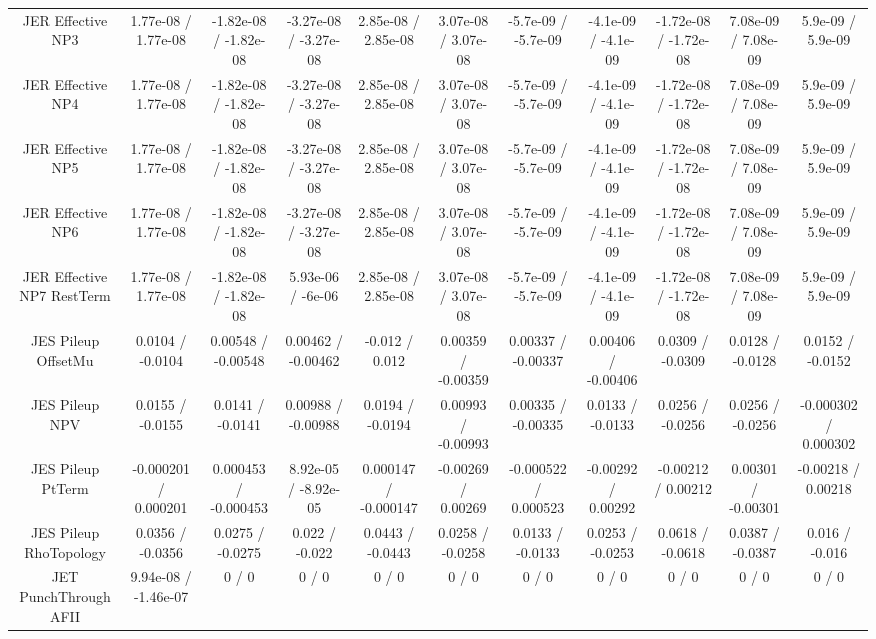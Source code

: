 \begin{table}[htbp]
\begin{center}
\begin{tabular}{|c|c|c|c|c|c|c|c|c|c|c|}
  JER Effective NP3 & 1.77e-08 / 1.77e-08 & -1.82e-08 / -1.82e-08 & -3.27e-08 / -3.27e-08 & 2.85e-08 / 2.85e-08 & 3.07e-08 / 3.07e-08 & -5.7e-09 / -5.7e-09 & -4.1e-09 / -4.1e-09 & -1.72e-08 / -1.72e-08 & 7.08e-09 / 7.08e-09 & 5.9e-09 / 5.9e-09 \\ 
  JER Effective NP4 & 1.77e-08 / 1.77e-08 & -1.82e-08 / -1.82e-08 & -3.27e-08 / -3.27e-08 & 2.85e-08 / 2.85e-08 & 3.07e-08 / 3.07e-08 & -5.7e-09 / -5.7e-09 & -4.1e-09 / -4.1e-09 & -1.72e-08 / -1.72e-08 & 7.08e-09 / 7.08e-09 & 5.9e-09 / 5.9e-09 \\ 
  JER Effective NP5 & 1.77e-08 / 1.77e-08 & -1.82e-08 / -1.82e-08 & -3.27e-08 / -3.27e-08 & 2.85e-08 / 2.85e-08 & 3.07e-08 / 3.07e-08 & -5.7e-09 / -5.7e-09 & -4.1e-09 / -4.1e-09 & -1.72e-08 / -1.72e-08 & 7.08e-09 / 7.08e-09 & 5.9e-09 / 5.9e-09 \\ 
  JER Effective NP6 & 1.77e-08 / 1.77e-08 & -1.82e-08 / -1.82e-08 & -3.27e-08 / -3.27e-08 & 2.85e-08 / 2.85e-08 & 3.07e-08 / 3.07e-08 & -5.7e-09 / -5.7e-09 & -4.1e-09 / -4.1e-09 & -1.72e-08 / -1.72e-08 & 7.08e-09 / 7.08e-09 & 5.9e-09 / 5.9e-09 \\ 
  JER Effective NP7 RestTerm & 1.77e-08 / 1.77e-08 & -1.82e-08 / -1.82e-08 & 5.93e-06 / -6e-06 & 2.85e-08 / 2.85e-08 & 3.07e-08 / 3.07e-08 & -5.7e-09 / -5.7e-09 & -4.1e-09 / -4.1e-09 & -1.72e-08 / -1.72e-08 & 7.08e-09 / 7.08e-09 & 5.9e-09 / 5.9e-09 \\ 
  JES Pileup OffsetMu & 0.0104 / -0.0104 & 0.00548 / -0.00548 & 0.00462 / -0.00462 & -0.012 / 0.012 & 0.00359 / -0.00359 & 0.00337 / -0.00337 & 0.00406 / -0.00406 & 0.0309 / -0.0309 & 0.0128 / -0.0128 & 0.0152 / -0.0152 \\ 
  JES Pileup NPV & 0.0155 / -0.0155 & 0.0141 / -0.0141 & 0.00988 / -0.00988 & 0.0194 / -0.0194 & 0.00993 / -0.00993 & 0.00335 / -0.00335 & 0.0133 / -0.0133 & 0.0256 / -0.0256 & 0.0256 / -0.0256 & -0.000302 / 0.000302 \\ 
  JES Pileup PtTerm & -0.000201 / 0.000201 & 0.000453 / -0.000453 & 8.92e-05 / -8.92e-05 & 0.000147 / -0.000147 & -0.00269 / 0.00269 & -0.000522 / 0.000523 & -0.00292 / 0.00292 & -0.00212 / 0.00212 & 0.00301 / -0.00301 & -0.00218 / 0.00218 \\ 
  JES Pileup RhoTopology & 0.0356 / -0.0356 & 0.0275 / -0.0275 & 0.022 / -0.022 & 0.0443 / -0.0443 & 0.0258 / -0.0258 & 0.0133 / -0.0133 & 0.0253 / -0.0253 & 0.0618 / -0.0618 & 0.0387 / -0.0387 & 0.016 / -0.016 \\ 
  JET PunchThrough AFII & 9.94e-08 / -1.46e-07 & 0 / 0 & 0 / 0 & 0 / 0 & 0 / 0 & 0 / 0 & 0 / 0 & 0 / 0 & 0 / 0 & 0 / 0 \\ 

\end{tabular}
\end{center}
\end{table}
